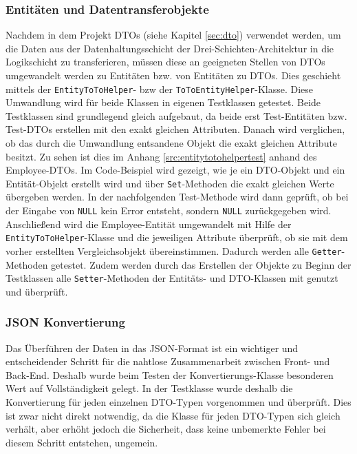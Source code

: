 \subsubsection{Entitäten und Datentransferobjekte}

Nachdem in dem Projekt \acsp{DTO} (siehe Kapitel \vref{sec:dto}) verwendet werden, um die Daten aus der Datenhaltungsschicht der Drei-Schichten-Architektur in die Logikschicht zu transferieren, müssen diese an geeigneten Stellen von \acsp{DTO} umgewandelt werden zu Entitäten bzw. von Entitäten zu \acsp{DTO}.
Dies geschieht mittels der \texttt{EntityToToHelper}- bzw der \texttt{ToToEntityHelper}-Klasse. Diese Umwandlung wird für beide Klassen in eigenen Testklassen getestet.
Beide Testklassen sind grundlegend gleich aufgebaut, da beide erst Test-Entitäten bzw. Test-\acsp{DTO} erstellen mit den exakt gleichen Attributen. 
Danach wird verglichen, ob das durch die Umwandlung entsandene Objekt die exakt gleichen Attribute besitzt. Zu sehen ist dies im Anhang \vref{src:entitytotohelpertest} anhand des Employee-\acsp{DTO}.
Im Code-Beispiel wird gezeigt, wie je ein \acs{DTO}-Objekt und ein Entität-Objekt erstellt wird und über \texttt{Set}-Methoden die exakt gleichen Werte übergeben werden. 
In der nachfolgenden Test-Methode wird dann geprüft, ob bei der Eingabe von \texttt{NULL} kein Error entsteht, sondern \texttt{NULL} zurückgegeben wird. 
Anschließend wird die Employee-Entität umgewandelt mit Hilfe der \texttt{EntityToToHelper}-Klasse und die jeweiligen Attribute überprüft, ob sie mit dem vorher erstellten Vergleichsobjekt übereinstimmen. 
Dadurch werden alle \texttt{Getter}-Methoden getestet. Zudem werden durch das Erstellen der Objekte zu Beginn der Testklassen alle \texttt{Setter}-Methoden der Entitäts- und \acs{DTO}-Klassen mit genutzt und überprüft. 

\subsubsection{JSON Konvertierung}

Das Überführen der Daten in das \acs{JSON}-Format ist ein wichtiger und entscheidender Schritt für die nahtlose Zusammenarbeit zwischen Front- und Back-End.
Deshalb wurde beim Testen der Konvertierungs-Klasse besonderen Wert auf Vollständigkeit gelegt. In der Testklasse wurde deshalb die Konvertierung für jeden einzelnen \acs{DTO}-Typen vorgenommen und überprüft.
Dies ist zwar nicht direkt notwendig, da die Klasse für jeden \acs{DTO}-Typen sich gleich verhält, aber erhöht jedoch die Sicherheit, dass keine unbemerkte Fehler bei diesem Schritt entstehen, ungemein. 


